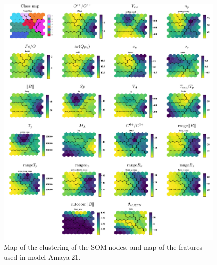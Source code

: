 \documentclass[utf8]{frontiersSCNS} %
\begin{document}
\begin{figure}[h!]\centering
	\includegraphics[width=18cm]{compmap}
	\caption{Map of the clustering of the SOM nodes, and map of the features used in model Amaya-21.}\label{fig:compmap}
\end{figure}
\end{document}
